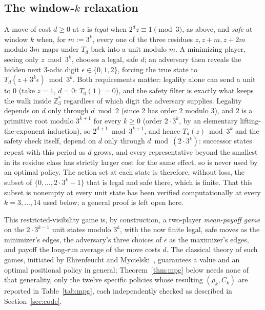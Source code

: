 \documentclass[11pt]{amsart}
\theoremstyle{plain}
\theoremstyle{definition}
\theoremstyle{remark}
\newcommand{\Z}{\mathbb{Z}}
\begin{document}
\subsection*{The window-$k$ relaxation}

A move of cost $d\ge0$ at $z$ is \emph{legal} when $2^dz\equiv1\pmod3$, as above, and \emph{safe} at
window $k$ when, for $m:=3^k$, every one of the three residues $z,z+m,z+2m$ modulo $3m$ maps under
$T_d$ back into a unit modulo $m$. A minimizing player, seeing only $z\bmod3^k$, chooses a legal, safe $d$;
an adversary then reveals the hidden next $3$-adic digit $\epsilon\in\{0,1,2\}$, forcing the true
state to $T_d(z+3^k\epsilon)\bmod3^k$. Both requirements matter: legality alone can send a unit to
$0$ (take $z=1$, $d=0$: $T_0(1)=0$), and the safety filter is exactly what keeps the walk inside
$\Z_3^*$ regardless of which digit the adversary supplies. Legality depends on $d$ only through
$d\bmod2$ (since $2$ has order $2$ modulo $3$), and $2$ is a primitive root modulo $3^{k+1}$ for
every $k\ge0$ (order $2\cdot3^k$, by an elementary lifting-the-exponent induction), so
$2^{d+1}\bmod3^{k+1}$, and hence $T_d(z)\bmod3^k$ and the safety check itself, depend on $d$ only
through $d\bmod(2\cdot3^k)$: successor states repeat with this period as $d$ grows, and every
representative beyond the smallest in its residue class has strictly larger cost for the same
effect, so is never used by an optimal policy. The action set at each state is therefore, without
loss, the subset of $\{0,\dots,2\cdot3^k-1\}$ that is legal and safe there, which is finite. That
this subset is nonempty at every unit state has been verified computationally at every $k=3,\dots,14$
used below; a general proof is left open here.

This restricted-visibility game is, by construction, a two-player \emph{mean-payoff game} on the
$2\cdot3^{k-1}$ unit states modulo $3^k$, with the now finite legal, safe moves as the minimizer's
edges, the adversary's three choices of $\epsilon$ as the maximizer's edges, and payoff the long-run
average of the move costs $d$. The classical theory of such games, initiated by Ehrenfeucht and
Mycielski~\cite{ehrenfeuchtmycielski1979}, guarantees a value and an optimal positional policy in
general; Theorem~\ref{thm:mpg} below needs none of that generality, only the twelve specific
policies whose resulting $(\rho_k,C_k)$ are reported in Table~\ref{tab:mpg}, each independently
checked as described in Section~\ref{sec:code}.
\end{document}
